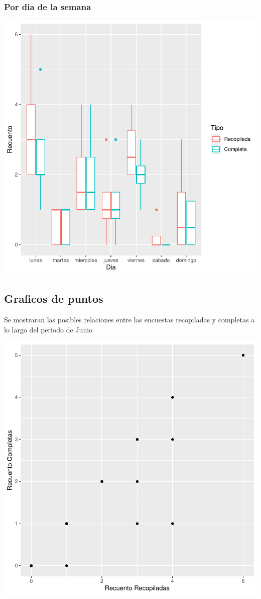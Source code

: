 \documentclass{article}
\begin{document}
\subsubsection{Por dia de la semana}

\includegraphics{seguimento2-096}

\subsection{Graficos de puntos}
Se mostraran las posibles relaciones entre las encuestas recopiladas y completas a lo largo del periodo de Junio

\includegraphics{seguimento2-097}
\end{document}
